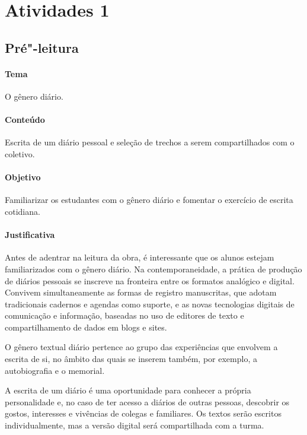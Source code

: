 \documentclass[12pt]{extarticle}
\begin{document}
\tableofcontents

\section{Atividades 1}


\subsection{Pré"-leitura}


\paragraph{Tema} O gênero diário.

\paragraph{Conteúdo} Escrita de um diário pessoal e seleção de trechos a serem compartilhados com o coletivo.

\paragraph{Objetivo} Familiarizar os estudantes com o gênero diário e fomentar o exercício de escrita cotidiana. 

\paragraph{Justificativa} Antes de adentrar na leitura da obra, é interessante que os
alunos estejam familiarizados com o gênero diário. Na contemporaneidade,
a prática de produção de diários pessoais se inscreve na fronteira entre
os formatos analógico e digital. Convivem simultaneamente as formas de
registro manuscritas, que adotam tradicionais cadernos e agendas como
suporte, e as novas tecnologias digitais de comunicação e informação,
baseadas no uso de editores de texto e compartilhamento de dados em
blogs e sites.

O gênero textual diário pertence ao grupo das experiências que envolvem
a escrita de si, no âmbito das quais se inserem também, por exemplo, a
autobiografia e o memorial.

A escrita de um diário é uma oportunidade para conhecer a
própria personalidade e, no caso de ter acesso a diários de outras
pessoas, descobrir os gostos, interesses e vivências de colegas e
familiares. Os textos serão escritos individualmente, mas a versão
digital será compartilhada com a turma.
\end{document}
